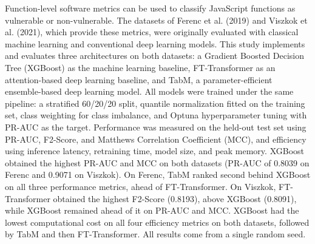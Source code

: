 \documentclass[skripsi,inggris]{ugmskripsi}
\DeclareRobustCommand{\_}{\ifmmode\mbox{\textunderscore}\else\textunderscore\allowbreak\fi}
\begin{document}
Function-level software metrics can be used to classify JavaScript functions as vulnerable or non-vulnerable. The datasets of Ferenc et al. (2019) and Viszkok et al. (2021), which provide these metrics, were originally evaluated with classical machine learning and conventional deep learning models. This study implements and evaluates three architectures on both datasets: a Gradient Boosted Decision Tree (XGBoost) as the machine learning baseline, FT-Transformer as an attention-based deep learning baseline, and TabM, a parameter-efficient ensemble-based deep learning model. All models were trained under the same pipeline: a stratified 60/20/20 split, quantile normalization fitted on the training set, class weighting for class imbalance, and Optuna hyperparameter tuning with PR-AUC as the target. Performance was measured on the held-out test set using PR-AUC, F2-Score, and Matthews Correlation Coefficient (MCC), and efficiency using inference latency, retraining time, model size, and peak memory. XGBoost obtained the highest PR-AUC and MCC on both datasets (PR-AUC of 0.8039 on Ferenc and 0.9071 on Viszkok). On Ferenc, TabM ranked second behind XGBoost on all three performance metrics, ahead of FT-Transformer. On Viszkok, FT-Transformer obtained the highest F2-Score (0.8193), above XGBoost (0.8091), while XGBoost remained ahead of it on PR-AUC and MCC. XGBoost had the lowest computational cost on all four efficiency metrics on both datasets, followed by TabM and then FT-Transformer. All results come from a single random seed.

\endabstracteng









\appendix

\end{document}

